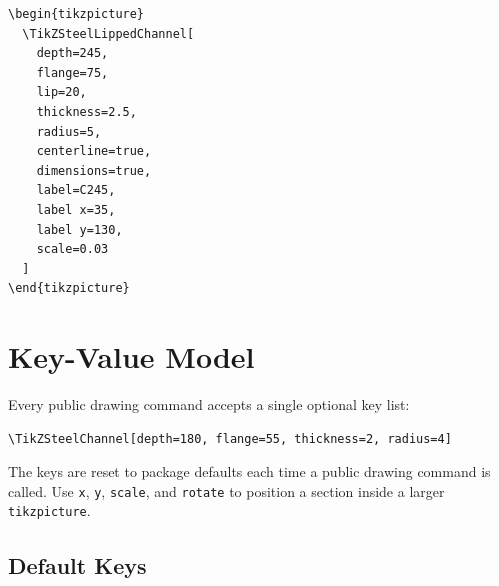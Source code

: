\documentclass[10pt]{article}
\newcommand{\keyname}[1]{\texttt{#1}}
\begin{document}
\begin{lstlisting}
\begin{tikzpicture}
  \TikZSteelLippedChannel[
    depth=245,
    flange=75,
    lip=20,
    thickness=2.5,
    radius=5,
    centerline=true,
    dimensions=true,
    label=C245,
    label x=35,
    label y=130,
    scale=0.03
  ]
\end{tikzpicture}
\end{lstlisting}

\section{Key-Value Model}

Every public drawing command accepts a single optional key list:

\begin{lstlisting}
\TikZSteelChannel[depth=180, flange=55, thickness=2, radius=4]
\end{lstlisting}

The keys are reset to package defaults each time a public drawing command is
called. Use \keyname{x}, \keyname{y}, \keyname{scale}, and \keyname{rotate} to
position a section inside a larger \texttt{tikzpicture}.

\subsection{Default Keys}
\end{document}
